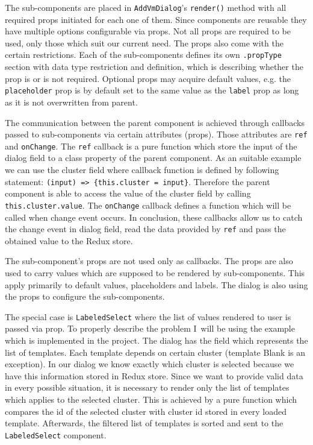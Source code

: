 The sub-components are placed in \texttt{AddVmDialog}'s \texttt{render()} method with all required props initiated for each one of them. Since components are reusable they have multiple options configurable via props. Not all props are required to be used, only those which suit our current need. The props also come with the certain restrictions. Each of the sub-components defines its own \texttt{.propType} section with data type restriction and definition, which is describing whether the prop is or is not required. Optional props may acquire default values, e.g. the \texttt{placeholder} prop is by default set to the same value as the \texttt{label} prop as long as it is not overwritten from parent.

The communication between the parent component is achieved through callbacks passed to sub-components via certain attributes (props). Those attributes are \texttt{ref} and \texttt{onChange}. The \texttt{ref} callback is a pure function which store the input of the dialog field to a class property of the parent component. As an suitable example we can use the cluster field where callback function is defined by following statement: \texttt{(input) => \{this.cluster = input\}}. Therefore the parent component is able to access the value of the cluster field by calling \texttt{this.cluster.value}. The \texttt{onChange} callback defines a function which will be called when change event occurs. In conclusion, these callbacks allow us to catch the change event in dialog field, read the data provided by \texttt{ref} and pass the obtained value to the Redux store.

The sub-component's props are not used only as callbacks. The props are also used to carry values which are supposed to be rendered by sub-components. This apply primarily to default values, placeholders and labels. The dialog is also using the props to configure the sub-components. 

The special case is \texttt{LabeledSelect} where the list of values rendered to user is passed via prop. To properly describe the problem I~will be using the example which is implemented in the project. The dialog has the field which represents the list of templates. Each template depends on certain cluster (template Blank is an exception). In our dialog we know exactly which cluster is selected because we have this information stored in Redux store. Since we want to provide valid data in every possible situation, it is necessary to render only the list of templates which applies to the selected cluster. This is achieved by a pure function which compares the id of the selected cluster with cluster id stored in every loaded template. Afterwards, the filtered list of templates is sorted and sent to the \texttt{LabeledSelect} component.

